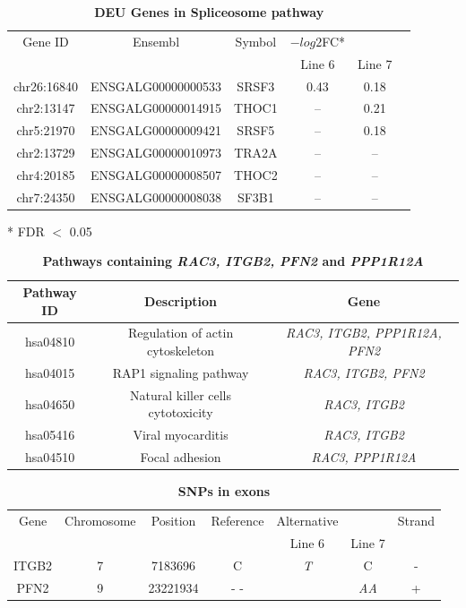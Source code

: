\documentclass[10pt]{article}
\begin{document}
\begin{table}[!ht]
\caption{
\bf{DEU Genes in Spliceosome pathway}}
\begin{tabular}{cccccc}
\hline
Gene ID &  Ensembl & Symbol  & $-log2$FC* & \\
        & & & Line 6 & Line 7 \\
\hline
chr26:16840 & ENSGALG00000000533 & SRSF3 & 0.43 & 0.18 \\
chr2:13147 & ENSGALG00000014915 & THOC1 & -- & 0.21 \\
chr5:21970 & ENSGALG00000009421 & SRSF5 & -- & 0.18 \\
chr2:13729 & ENSGALG00000010973 & TRA2A & -- & -- \\
chr4:20185 & ENSGALG00000008507 & THOC2 & -- & -- \\
chr7:24350 & ENSGALG00000008038 & SF3B1 & -- & -- \\
\hline
\end{tabular}
\begin{flushleft}
    * FDR $<$ 0.05
\end{flushleft}
\label{tab:spliceosome}
\end{table}

\begin{table}[!ht]
\caption{
\bf{Pathways containing \textit{RAC3, ITGB2, PFN2} and \textit{PPP1R12A}}}
\begin{tabular}{ccc}
\hline
Pathway ID &  Description & Gene \\
\hline
hsa04810 & Regulation of actin cytoskeleton & \textit{RAC3, ITGB2, PPP1R12A, PFN2} \\
hsa04015 & RAP1 signaling pathway & \textit{RAC3, ITGB2, PFN2} \\
hsa04650 & Natural killer cells cytotoxicity & \textit{RAC3, ITGB2} \\
hsa05416 & Viral myocarditis & \textit{RAC3, ITGB2} \\
hsa04510 & Focal adhesion & \textit{RAC3, PPP1R12A} \\
\hline
\end{tabular}
\begin{flushleft}
\end{flushleft}
\label{tab:integrin}
\end{table}

\begin{table}[!ht]
\caption{
\bf{SNPs in exons}}
\begin{tabular}{ccccccc}
\hline
Gene &  Chromosome & Position & Reference & Alternative & & Strand \\
&  & & & Line 6 & Line 7 \\
\hline
ITGB2 & 7 & 7183696 & C & \textit{T} & C & - \\
PFN2 & 9 & 23221934 & -  - & & \textit{AA} & + \\
\hline
\end{tabular}
\begin{flushleft}
\end{flushleft}
\label{tab:spliceosome}
\end{table}
\end{document}
